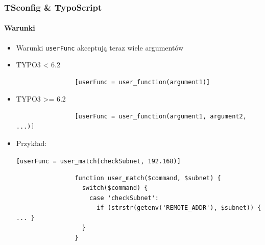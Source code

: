 \begin{frame}[fragile]
	\frametitle{TSconfig \& TypoScript}
	\framesubtitle{Warunki}

	\begin{itemize}
		\item Warunki \texttt{userFunc} akceptują teraz wiele argumentów

		\item TYPO3 < 6.2
			\begin{lstlisting}
				[userFunc = user_function(argument1)]
			\end{lstlisting}

		\item TYPO3 >= 6.2
			\begin{lstlisting}
				[userFunc = user_function(argument1, argument2, ...)]
			\end{lstlisting}

		\item Przykład:

			\lstinline![userFunc = user_match(checkSubnet, 192.168)]!

			\begin{lstlisting}
				function user_match($command, $subnet) {
				  switch($command) {
				    case 'checkSubnet':
				      if (strstr(getenv('REMOTE_ADDR'), $subnet)) { ... }
				  }
				}
			\end{lstlisting}

	\end{itemize}

\end{frame}


